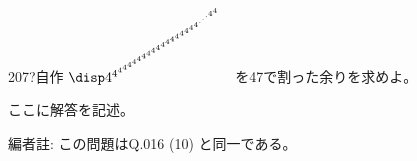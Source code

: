 \begin{prob}{207}{\hosi ?}{自作}
 $\disp 4^{4^{4^{4^{4^{4^{4^{4^{4^{4^{4^{4^{4^{4^{4^{4^{4^{4^{4^{\cdot^{\cdot^{\cdot^{4^{4}}}}}}}}}}}}}}}}}}}}}}}$を47で割った余りを求めよ。\\
\end{prob}
ここに解答を記述。

編者註: この問題はQ.016 (10) と同一である。